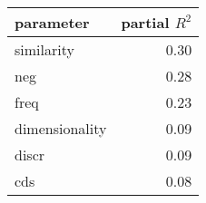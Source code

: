 \begin{tabular}{lr}
\toprule
      parameter &  partial $R^2$ \\
\midrule
     similarity &     0.30 \\
            neg &     0.28 \\
           freq &     0.23 \\
 dimensionality &     0.09 \\
          discr &     0.09 \\
            cds &     0.08 \\
\bottomrule
\end{tabular}
